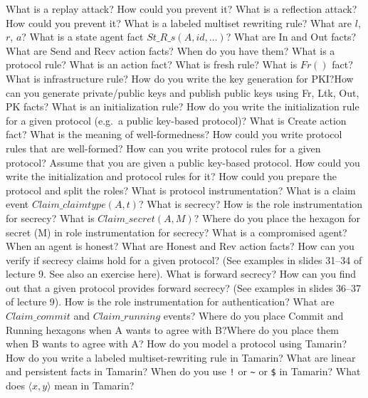 \begin{questions}
\question{} What is a replay attack? How could you prevent it?
\question{} What is a reflection attack? How could you prevent it?
\question{} What is a labeled multiset rewriting rule? What are $l$, $r$, $a$?
\question{} What is a state agent fact $St\_R\_s(A, id, \ldots)$?
\question{} What are In and Out facts? What are Send and Recv action facts? When do you have them?
\question{} What is a protocol rule? What is an action fact?
\question{} What is fresh rule? What is $Fr()$ fact?
\question{} What is infrastructure rule? How do you write the key generation for PKI?\@ How can you generate private/public keys and publish public keys using Fr, Ltk, Out, PK facts?
\question{} What is an initialization rule? How do you write the initialization rule for a given protocol (e.g.\ a public key-based protocol)? What is Create action fact?
\question{} What is the meaning of well-formedness? How could you write protocol rules that are well-formed?
\question{} How can you write protocol rules for a given protocol?
\question{} Assume that you are given a public key-based protocol. How could you write the initialization and protocol rules for it? How could you prepare the protocol and split the roles?
\question{} What is protocol instrumentation? What is a claim event $Claim\_claimtype(A,t)$?
\question{} What is secrecy?
\question{} How is the role instrumentation for secrecy? What is $Claim\_secret(A,M)$? Where do you place the hexagon for secret (M) in role instrumentation for secrecy?
\question{} What is a compromised agent? When an agent is honest? What are Honest and Rev action facts?
\question{} How can you verify if secrecy claims hold for a given protocol? (See examples in slides 31--34 of lecture 9. See also an exercise here).
\question{} What is forward secrecy?
\question{} How can you find out that a given protocol provides forward secrecy? (See examples in slides 36--37 of lecture 9).
\question{} How is the role instrumentation for authentication? What are $Claim\_commit$ and $Claim\_running$ events? Where do you place Commit and Running hexagons when A wants to agree with B?\@ Where do you place them when B wants to agree with A?\@
\question{} How do you model a protocol using Tamarin? How do you write a labeled multiset-rewriting rule in Tamarin?
\question{} What are linear and persistent facts in Tamarin? When do you use \texttt{!} or \texttt{\textasciitilde{}} or \texttt{\$} in Tamarin?
\question{} What does $\langle x, y \rangle$ mean in Tamarin?
\end{questions}
